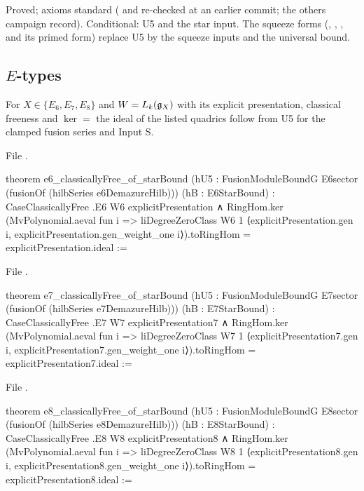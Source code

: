 \begin{status}
Proved; axioms standard ( and  re-checked at an earlier commit; the
others campaign record). Conditional: U5 and the star input. The squeeze forms (,
, ,  and its primed form) replace U5 by the squeeze inputs
and the universal bound.
\end{status}

\subsection{\texorpdfstring{$E$}{E}-types}

\begin{theorem}[$E_6$, $E_7$, $E_8$ headlines]\label{l27:thm:Eladder}
For $X\in\{E_6,E_7,E_8\}$ and $W=L_k(\mathfrak g_X)$ with its explicit presentation, classical freeness and $\ker=$ the ideal of the listed
quadrics follow from U5 for the clamped fusion series and Input S.
\end{theorem}
\noindent File .
\begin{leancode}
theorem e6_classicallyFree_of_starBound
    (hU5 : FusionModuleBoundG E6sector (fusionOf (hilbSeries e6DemazureHilb)))
    (hB : E6StarBound) :
    CaseClassicallyFree .E6 W6 explicitPresentation ∧
      RingHom.ker (MvPolynomial.aeval fun i =>
        liDegreeZeroClass W6 1 ⟨explicitPresentation.gen i,
          explicitPresentation.gen_weight_one i⟩).toRingHom = explicitPresentation.ideal :=
\end{leancode}
\noindent File .
\begin{leancode}
theorem e7_classicallyFree_of_starBound
    (hU5 : FusionModuleBoundG E7sector (fusionOf (hilbSeries e7DemazureHilb)))
    (hB : E7StarBound) :
    CaseClassicallyFree .E7 W7 explicitPresentation7 ∧
      RingHom.ker (MvPolynomial.aeval fun i =>
        liDegreeZeroClass W7 1 ⟨explicitPresentation7.gen i,
          explicitPresentation7.gen_weight_one i⟩).toRingHom = explicitPresentation7.ideal :=
\end{leancode}
\noindent File .
\begin{leancode}
theorem e8_classicallyFree_of_starBound
    (hU5 : FusionModuleBoundG E8sector (fusionOf (hilbSeries e8DemazureHilb)))
    (hB : E8StarBound) :
    CaseClassicallyFree .E8 W8 explicitPresentation8 ∧
      RingHom.ker (MvPolynomial.aeval fun i =>
        liDegreeZeroClass W8 1 ⟨explicitPresentation8.gen i,
          explicitPresentation8.gen_weight_one i⟩).toRingHom = explicitPresentation8.ideal :=
\end{leancode}

